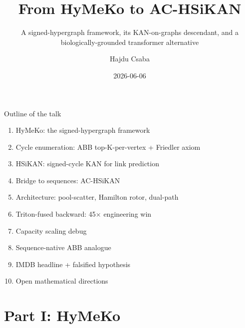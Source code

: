 \documentclass[aspectratio=169, 11pt]{beamer}
\title[HyMeKo $\to$ AC-HSiKAN]{From HyMeKo to AC-HSiKAN}
\subtitle{A signed-hypergraph framework, its KAN-on-graphs descendant,
          and a biologically-grounded transformer alternative}
\author[Hajdu Cs.]{Hajdu Csaba}
\institute[Budapest]{Computational Neuroscience and AI Group, Budapest}
\date{2026-06-06}
\begin{document}
\begin{frame}
  \titlepage
\end{frame}

\begin{frame}{Outline of the talk}
  \begin{enumerate}
  \item HyMeKo: the signed-hypergraph framework
  \item Cycle enumeration: ABB top-K-per-vertex + Friedler axiom
  \item HSiKAN: signed-cycle KAN for link prediction
  \item Bridge to sequences: AC-HSiKAN
  \item Architecture: pool-scatter, Hamilton rotor, dual-path
  \item Triton-fused backward: 45$\times$ engineering win
  \item Capacity scaling debug
  \item Sequence-native ABB analogue
  \item IMDB headline + falsified hypothesis
  \item Open mathematical directions
  \end{enumerate}
\end{frame}

\section{Part I: HyMeKo}
\end{document}
